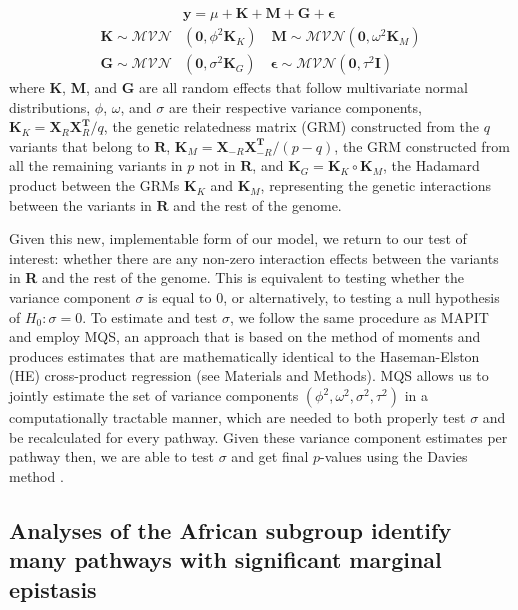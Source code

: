 \documentclass[12pt,a4paper]{article}
\begin{document}
\begin{align}\label{Overview2}
    & \textbf{y} = \mu + \textbf{K} + \textbf{M} + \textbf{G} + \boldsymbol{\epsilon} \\
    \textbf{K} \sim \mathcal{MVN}&(\textbf{0}, \phi^{2}\textbf{K}_K) \quad \textbf{M} \sim \mathcal{MVN}(\textbf{0}, \omega^{2}\textbf{K}_M) \nonumber \\ 
    \textbf{G} \sim \mathcal{MVN}&(\textbf{0}, \sigma^{2}\textbf{K}_G) \quad \boldsymbol{\epsilon} \sim \mathcal{MVN}(\textbf{0}, \tau^{2}\textbf{I}) \nonumber 
\end{align}
where \textbf{K}, \textbf{M}, and \textbf{G} are all random effects that follow multivariate normal distributions, $\phi$, $\omega$, and $\sigma$ are their respective variance components, $\textbf{K}_K = \textbf{X}_{R}\textbf{X}^{\textbf{T}}_{R}/q$, the genetic relatedness matrix (GRM) constructed from the $q$ variants that belong to $\textbf{R}$, $\textbf{K}_M = \textbf{X}_{-R}\textbf{X}^{\textbf{T}}_{-R}/(p-q)$, the GRM constructed from all the remaining variants in $p$ not in $\textbf{R}$, and $\textbf{K}_G = \textbf{K}_K \circ \textbf{K}_M$, the Hadamard product between the GRMs $\textbf{K}_K$ and $\textbf{K}_M$, representing the genetic interactions between the variants in $\textbf{R}$ and the rest of the genome.

Given this new, implementable form of our model, we return to our test of interest: whether there are any non-zero interaction effects between the variants in \textbf{R} and the rest of the genome. This is equivalent to testing whether the variance component $\sigma$ is equal to 0, or alternatively, to testing a null hypothesis of $H_0: \sigma = 0$. To estimate and test $\sigma$, we follow the same procedure as MAPIT and employ MQS, an approach that is based on the method of moments and produces estimates that are mathematically identical to the Haseman-Elston (HE) cross-product regression \citep{Haseman1972, Zhou2017} (see Materials and Methods). MQS allows us to jointly estimate the set of variance components $(\phi^{2}, \omega^{2}, \sigma^{2}, \tau^{2})$ in a computationally tractable manner, which are needed to both properly test $\sigma$ and be recalculated for every pathway. Given these variance component estimates per pathway then, we are able to test $\sigma$ and get final $p$-values using the Davies method \citep{Crawford2017a,Davies1980}.  

\subsection{Analyses of the African subgroup identify many pathways with significant marginal epistasis}\label{InterPath-Results-PathwayEpistasis}
\end{document}
